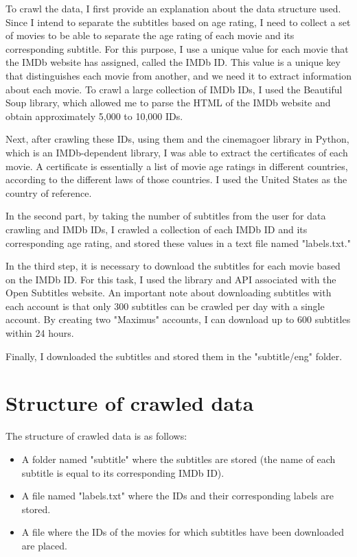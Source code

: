 \documentclass[a4paper]{article}
\begin{document}
To crawl the data, I first provide an explanation about the data structure used. Since I intend to separate the subtitles based on age rating, I need to collect a set of movies to be able to separate the age rating of each movie and its corresponding subtitle. For this purpose, I use a unique value for each movie that the IMDb website has assigned, called the IMDb ID. This value is a unique key that distinguishes each movie from another, and we need it to extract information about each movie. To crawl a large collection of IMDb IDs, I used the Beautiful Soup library, which allowed me to parse the HTML of the IMDb website and obtain approximately 5,000 to 10,000 IDs.

Next, after crawling these IDs, using them and the cinemagoer library in Python, which is an IMDb-dependent library, I was able to extract the certificates of each movie. A certificate is essentially a list of movie age ratings in different countries, according to the different laws of those countries. I used the United States as the country of reference.

In the second part, by taking the number of subtitles from the user for data crawling and IMDb IDs, I crawled a collection of each IMDb ID and its corresponding age rating, and stored these values in a text file named "labels.txt."

In the third step, it is necessary to download the subtitles for each movie based on the IMDb ID. For this task, I used the library and API associated with the Open Subtitles website. An important note about downloading subtitles with each account is that only 300 subtitles can be crawled per day with a single account. By creating two "Maximus" accounts, I can download up to 600 subtitles within 24 hours.

Finally, I downloaded the subtitles and stored them in the "subtitle/eng" folder. 

\section{Structure of crawled data}

The structure of crawled data is as follows:

\begin{itemize}
  \item A folder named "subtitle" where the subtitles are stored (the name of each subtitle is equal to its corresponding IMDb ID).
  \item A file named "labels.txt" where the IDs and their corresponding labels are stored.
  \item A file  where the IDs of the movies for which subtitles have been downloaded are placed.
\end{itemize}
\end{document}

